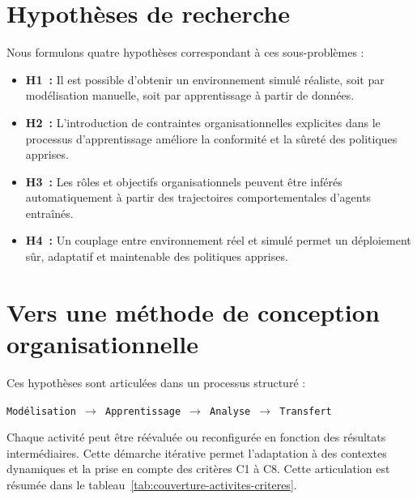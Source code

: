 \section{Hypothèses de recherche}

Nous formulons quatre hypothèses correspondant à ces sous-problèmes :

\begin{itemize}
  \item \textbf{H1~:} Il est possible d’obtenir un environnement simulé réaliste, soit par modélisation manuelle, soit par apprentissage à partir de données.
  \item \textbf{H2~:} L’introduction de contraintes organisationnelles explicites dans le processus d’apprentissage améliore la conformité et la sûreté des politiques apprises.
  \item \textbf{H3~:} Les rôles et objectifs organisationnels peuvent être inférés automatiquement à partir des trajectoires comportementales d’agents entraînés.
  \item \textbf{H4~:} Un couplage entre environnement réel et simulé permet un déploiement sûr, adaptatif et maintenable des politiques apprises.
\end{itemize}

\section{Vers une méthode de conception organisationnelle}

Ces hypothèses sont articulées dans un processus structuré :
\begin{center}
  \texttt{Modélisation $\rightarrow$ Apprentissage $\rightarrow$ Analyse $\rightarrow$ Transfert}
\end{center}

\noindent
Chaque activité peut être réévaluée ou reconfigurée en fonction des résultats intermédiaires. Cette démarche itérative permet l’adaptation à des contextes dynamiques et la prise en compte des critères C1 à C8.
%
Cette articulation est résumée dans le tableau~\ref{tab:couverture-activites-criteres}.

